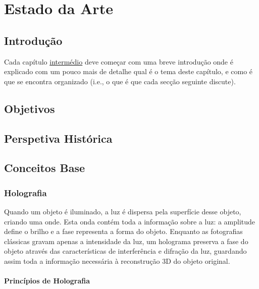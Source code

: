 \chapter{Estado da Arte}
\label{chap:estado-da-arte}

\section{Introdução}
\label{chap2:sec:intro}

Cada capítulo \underline{intermédio} deve começar com uma breve introdução onde é explicado com um pouco mais de detalhe qual é o tema deste capítulo, e como é que se encontra organizado (i.e., o que é que cada secção seguinte discute). 


\section{Objetivos}


\section{Perspetiva Histórica}

\section{Conceitos Base}
\label{chap2:sec:concetos-base}

\subsection{Holografia}
\label{chap2:subsec:holografia}

Quando um objeto é iluminado, a luz é dispersa pela superfície desse objeto, criando uma onde. Esta onda contém toda a informação sobre a luz: a amplitude define o brilho e a fase representa a forma do objeto. Enquanto as fotografias clássicas gravam apenas a intensidade da luz, um holograma preserva a fase do objeto através das características de interferência e difração da luz, guardando assim toda a informação necessária à reconstrução 3D do objeto original.


\subsubsection{Princípios de Holografia}
\label{chap2:ssubsec:principios-holografia} 

